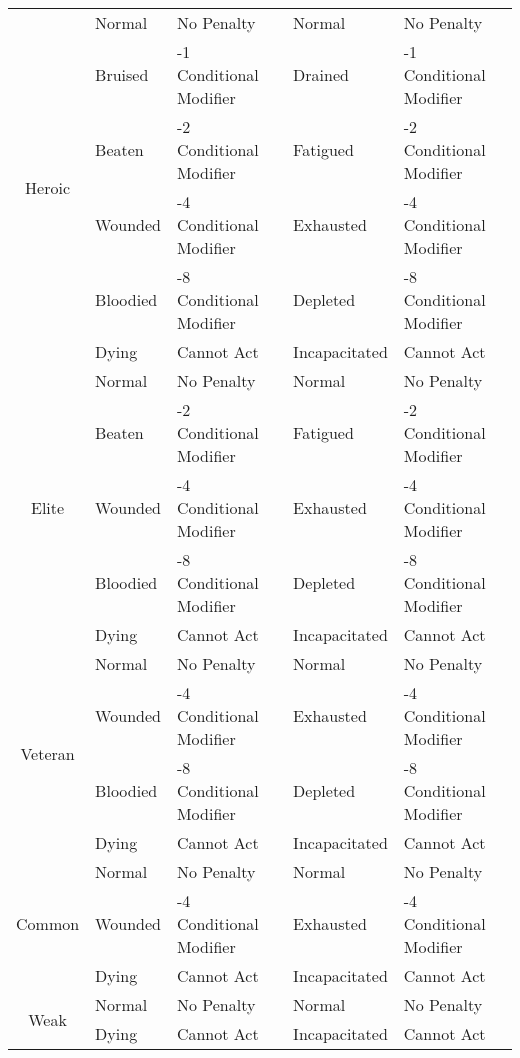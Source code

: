 \documentclass[11pt]{article}
\begin{document}
\begin{center}
\begin{tabular}{|c|ll|ll|}
		\multirow{6}{*}{Heroic}
		 & Normal   & No Penalty              & Normal        & No Penalty              \\
		 & Bruised  & -1 Conditional Modifier & Drained       & -1 Conditional Modifier \\
		 & Beaten   & -2 Conditional Modifier & Fatigued      & -2 Conditional Modifier \\
		 & Wounded  & -4 Conditional Modifier & Exhausted     & -4 Conditional Modifier \\
		 & Bloodied & -8 Conditional Modifier & Depleted      & -8 Conditional Modifier \\
		 & Dying    & Cannot Act              & Incapacitated & Cannot Act              \\
		\hline
		\multirow{5}{*}{Elite}
		 & Normal   & No Penalty              & Normal        & No Penalty              \\
		 & Beaten   & -2 Conditional Modifier & Fatigued      & -2 Conditional Modifier \\
		 & Wounded  & -4 Conditional Modifier & Exhausted     & -4 Conditional Modifier \\
		 & Bloodied & -8 Conditional Modifier & Depleted      & -8 Conditional Modifier \\
		 & Dying    & Cannot Act              & Incapacitated & Cannot Act              \\
		\hline
		\multirow{4}{*}{Veteran}
		 & Normal   & No Penalty              & Normal        & No Penalty              \\
		 & Wounded  & -4 Conditional Modifier & Exhausted     & -4 Conditional Modifier \\
		 & Bloodied & -8 Conditional Modifier & Depleted      & -8 Conditional Modifier \\
		 & Dying    & Cannot Act              & Incapacitated & Cannot Act              \\
		\hline
		\multirow{3}{*}{Common}
		 & Normal   & No Penalty              & Normal        & No Penalty              \\
		 & Wounded  & -4 Conditional Modifier & Exhausted     & -4 Conditional Modifier \\
		 & Dying    & Cannot Act              & Incapacitated & Cannot Act              \\
		\hline
		\multirow{2}{*}{Weak}
		 & Normal   & No Penalty              & Normal        & No Penalty              \\
		 & Dying    & Cannot Act              & Incapacitated & Cannot Act              \\
		\hline
	\end{tabular}
\end{center}
\end{document}
